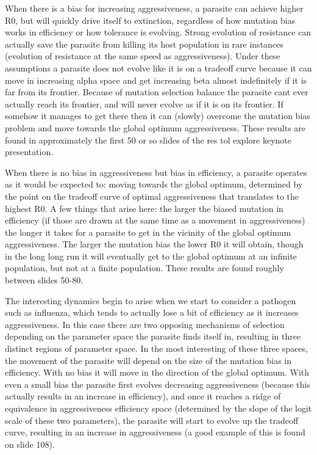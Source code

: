 \documentclass{article}
\begin{document}
When there is a bias for increasing aggressiveness, a parasite can achieve higher R0, but will quickly drive itself to extinction, regardless of how mutation bias works in efficiency or how tolerance is evolving. Strong evolution of resistance can actually save the parasite from killing its host population in rare instances (evolution of resistance at the same speed as aggressiveness). Under these assumptions a parasite does not evolve like it is on a tradeoff curve because it can move in increasing alpha space and get increasing beta almost indefinitely if it is far from its frontier. Because of mutation selection balance the parasite cant ever actually reach its frontier, and will never evolve as if it is on its frontier. If somehow it manages to get there then it can (slowly) overcome the mutation bias problem and move towards the global optimum aggressiveness. These results are found in approximately the first 50 or so slides of the res tol explore keynote presentation.

When there is no bias in aggressiveness but bias in efficiency, a parasite operates as it would be expected to: moving towards the global optimum, determined by the point on the tradeoff curve of optimal aggressiveness that translates to the highest R0. A few things that arise here: the larger the biased mutation in efficiency (if those are drawn at the same time as a movement in aggressiveness) the longer it takes for a parasite to get in the vicinity of the global optimum aggressiveness. The larger the mutation bias the lower R0 it will obtain, though in the long long run it will eventually get to the global optimum at an infinite population, but not at a finite population. These results are found roughly between slides 50-80.

The interesting dynamics begin to arise when we start to consider a pathogen such as influenza, which tends to actually lose a bit of efficiency as it increases aggressiveness. In this case there are two opposing mechanisms of selection depending on the parameter space the parasite finds itself in, resulting in three distinct regions of parameter space. In the most interesting of these three spaces, the movement of the parasite will depend on the size of the mutation bias in efficiency. With no bias it will move in the direction of the global optimum. With even a small bias the parasite first evolves decreasing aggressiveness (because this actually results in an increase in efficiency), and once it reaches a ridge of equivalence in aggressiveness efficiency space (determined by the slope of the logit scale of these two parameters), the parasite will start to evolve up the tradeoff curve, resulting in an increase in aggressiveness (a good example of this is found on slide 108).
\end{document}
